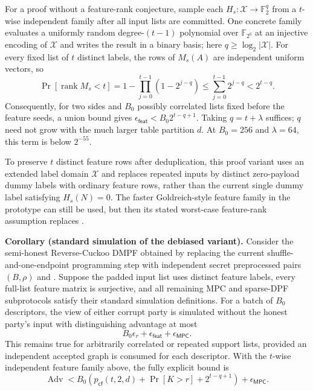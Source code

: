 For a proof without a feature-rank conjecture, sample each
$H_s:\mathcal X\to\mathbb F_2^q$ from a $t$-wise independent family after all
input lists are committed.  One concrete family evaluates a uniformly random
degree-$(t-1)$ polynomial over $\mathbb F_{2^q}$ at an injective encoding of
$\mathcal X$ and writes the result in a binary basis; here
$q\geq\log_2|\mathcal X|$.  For every fixed list of $t$ distinct labels, the
rows of $M_s(A)$ are independent uniform vectors, so
\begin{equation}\label{eq:rev-cuckoo-feature-rank}
 \Pr[\operatorname{rank}M_s<t]
 =1-\prod_{j=0}^{t-1}(1-2^{j-q})
 \leq\sum_{j=0}^{t-1}2^{j-q}<2^{t-q}.
\end{equation}
Consequently, for two sides and $B_0$ possibly correlated lists fixed before
the feature seeds, a union bound gives
$\epsilon_{\mathsf{feat}}<B_0 2^{t-q+1}$.  Taking $q=t+\lambda$ suffices;
$q$ need not grow with the much larger table partition $d$.  At
$B_0=256$ and $\lambda=64$, this term is below $2^{-55}$.

To preserve $t$ distinct feature rows after deduplication, this proof variant
uses an extended label domain $\mathcal X$ and replaces repeated inputs by
distinct zero-payload dummy labels with ordinary feature rows, rather than the
current single dummy label satisfying $H_s(N)=0$.  The faster
Goldreich-style feature family in the prototype can still be used, but then
its stated worst-case feature-rank assumption replaces
.

\medskip
\noindent\textbf{Corollary (standard simulation of the debiased variant).}
Consider the semi-honest Reverse-Cuckoo DMPF obtained by replacing the
current shuffle-and-one-endpoint programming step with independent secret
preprocessed pairs $(B,\rho)$ and
.  Suppose the padded input
list uses distinct feature labels, every full-list feature matrix is
surjective, and all remaining MPC and sparse-DPF subprotocols satisfy their
standard simulation definitions.  For a batch of $B_0$ descriptors, the
view of either corrupt party is simulated without the honest party's input
with distinguishing advantage at most
\begin{equation}\label{eq:rev-cuckoo-debiased-security}
 B_0\epsilon_r
 +\epsilon_{\mathsf{feat}}+\epsilon_{\mathsf{MPC}}.
\end{equation}
This remains true for arbitrarily correlated or repeated support lists,
provided an independent accepted graph is consumed for each descriptor.
With the $t$-wise independent feature family above, the fully explicit bound
is
\begin{equation}\label{eq:rev-cuckoo-explicit-security}
 \operatorname{Adv}
 <B_0\left(
 p_{\mathsf{cf}}(t,2,d)+\Pr[K>r]+2^{t-q+1}
 \right)+\epsilon_{\mathsf{MPC}}.
\end{equation}

